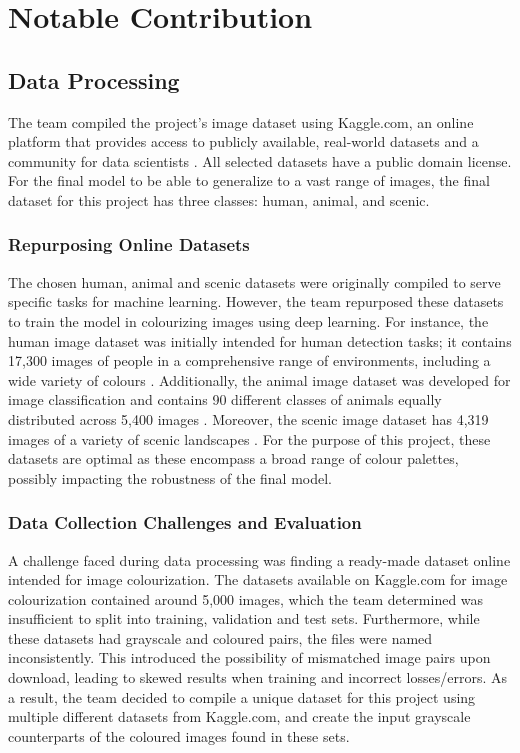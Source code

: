 \documentclass{article} %
\begin{document}
\section{Notable Contribution}

\subsection{Data Processing}

 The team compiled the project's image dataset using Kaggle.com, an online platform that provides access to publicly available, real-world datasets and a community for data scientists \citep[]{kaggle}. All selected datasets have a public domain license. For the final model to be able to generalize to a vast range of images, the final dataset for this project has three classes: human, animal, and scenic.

 \subsubsection{Repurposing Online Datasets}

 The chosen human, animal and scenic datasets were originally compiled to serve specific tasks for machine learning. However, the team repurposed these datasets to train the model in colourizing images using deep learning. For instance, the human image dataset was initially intended for human detection tasks; it contains 17,300 images of people in a comprehensive range of environments, including a wide variety of colours \citep[]{kaggle_human}. Additionally, the animal image dataset was developed for image classification and contains 90 different classes of animals equally distributed across 5,400 images \citep[]{kaggle_animal}. Moreover, the scenic image dataset has 4,319 images of a variety of scenic landscapes \citep{kaggle_scene}. For the purpose of this project, these datasets are optimal as these encompass a broad range of colour palettes, possibly impacting the robustness of the final model.

\subsubsection{Data Collection Challenges and Evaluation}

A challenge faced during data processing was finding a ready-made dataset online intended for image colourization. The datasets available on Kaggle.com for image colourization contained around 5,000 images, which the team determined was insufficient to split into training, validation and test sets. Furthermore, while these datasets had grayscale and coloured pairs, the files were named inconsistently. This introduced the possibility of mismatched image pairs upon download, leading to skewed results when training and incorrect losses/errors. As a result, the team decided to compile a unique dataset for this project using multiple different datasets from Kaggle.com, and create the input grayscale counterparts of the coloured images found in these sets. 
\end{document}
